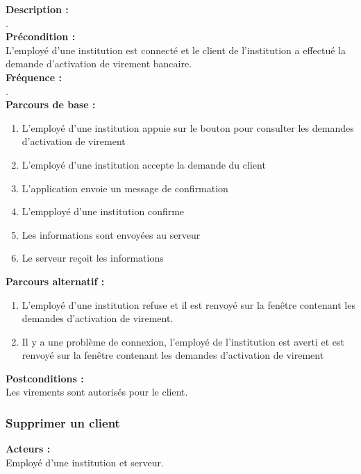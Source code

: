 \documentclass[../rapport.tex]{subfiles}
\begin{document}
\textbf{Description :} \\
. \\

\textbf{Précondition :} \\
L'employé d'une institution est connecté et le client de l'institution a effectué la demande d'activation de virement bancaire. \\

\textbf{Fréquence :} \\
. \\

\textbf{Parcours de base :} \\
\begin{enumerate}
    \item L'employé d'une institution appuie sur le bouton pour consulter les demandes d'activation de virement
    \item L'employé d'une institution accepte la demande du client
    \item L'application envoie un message de confirmation
    \item L'empployé d'une institution confirme
    \item Les informations sont envoyées au serveur
    \item Le serveur reçoit les informations
\end{enumerate}
\bigskip

\textbf{Parcours alternatif :}
\begin{enumerate}
    \item L'employé d'une institution refuse et il est renvoyé sur la fenêtre contenant les demandes d'activation de virement.
    \item Il y a une problème de connexion, l'employé de l'institution est averti et est renvoyé sur la fenêtre contenant les demandes d'activation de virement
\end{enumerate}

\textbf{Postconditions :} \\
Les virements sont autorisés pour le client. \\



\subsubsection{Supprimer un client}

\textbf{Acteurs :} \\
Employé d'une institution et serveur. \\
\end{document}

